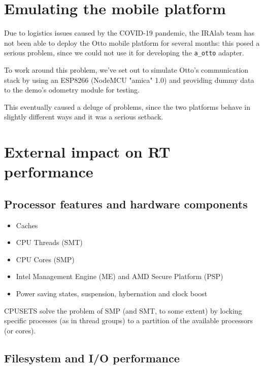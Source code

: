 \documentclass[a4paper,12pt]{report}
\begin{document}
\section{Emulating the mobile platform}

Due to logistics issues caused by the COVID-19 pandemic, the IRAlab team has not been able to deploy the Otto mobile platform for several months: this posed a serious problem, since we could not use it for developing the \texttt{a\_otto} adapter.

To work around this problem, we've set out to simulate Otto's communication stack by using an ESP8266 (NodeMCU "amica" 1.0) and providing dummy data to the demo's odometry module for testing. 

This eventually caused a deluge of problems, since the two platforms behave in slightly different ways and it was a serious setback.

\section{External impact on RT performance}

\subsection{Processor features and hardware components}
\begin{itemize}
    \item Caches
    \item CPU Threads (SMT)
    \item CPU Cores (SMP)
    \item Intel Management Engine (ME) and AMD Secure Platform (PSP)
    \item Power saving states, suspension, hybernation and clock boost
\end{itemize}

CPUSETS solve the problem of SMP (and SMT, to some extent) by locking specific processes (as in thread groups) to a partition of the available processors (or cores).

\subsection{Filesystem and I/O performance}

\printbibliography
\end{document}
